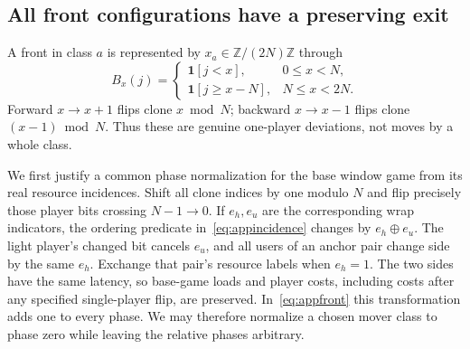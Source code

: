 \documentclass[manuscript,review,anonymous]{acmart}
\newcommand{\ind}{\mathbf 1}
\newcommand{\xor}{\mathbin{\oplus}}
\begin{document}
\subsection{All front configurations have a preserving exit}\label{app:frontcoverage}
A front in class $a$ is represented by $x_a\in\mathbb Z/(2N)\mathbb Z$ through
\begin{equation}\label{eq:appfront}
 B_x(j)=\begin{cases}
 \ind[j<x],&0\le x<N,\\
 \ind[j\ge x-N],&N\le x<2N.
 \end{cases}
\end{equation}
Forward $x\to x+1$ flips clone $x\bmod N$; backward $x\to x-1$ flips clone $(x-1)\bmod N$. Thus these are genuine one-player deviations, not moves by a whole class.

We first justify a common phase normalization for the base window game from its real resource incidences. Shift all clone indices by one modulo $N$ and flip precisely those player bits crossing $N-1\to0$. If $e_h,e_u$ are the corresponding wrap indicators, the ordering predicate in~\eqref{eq:appincidence} changes by $e_h\xor e_u$. The light player's changed bit cancels $e_u$, and all users of an anchor pair change side by the same $e_h$. Exchange that pair's resource labels when $e_h=1$. The two sides have the same latency, so base-game loads and player costs, including costs after any specified single-player flip, are preserved. In~\eqref{eq:appfront} this transformation adds one to every phase. We may therefore normalize a chosen mover class to phase zero while leaving the relative phases arbitrary.
\end{document}
